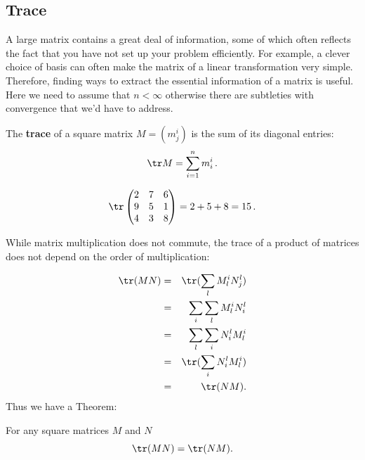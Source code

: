 \subsection{Trace}

A large matrix contains a great deal of information, some of which often reflects the fact that you have not set up your problem efficiently. For example, a clever choice of basis can often make the matrix of a linear transformation very simple. Therefore, finding ways to extract the essential information of a matrix is useful. Here we need to assume that $n < \infty$ otherwise there are subtleties with convergence that we'd have to address.

\begin{definition}
The \hypertarget{TRACE}{{\bf trace}} of a square matrix $M=(m_j^i)$ is the sum of its diagonal entries:
\[
\tr M = \sum_{i=1}^{n}m_i^i\, .
\]
\end{definition}

\begin{example}
\[
\tr \begin{pmatrix}
2 & 7 & 6\\
9 & 5 & 1\\
4 & 3 & 8\\
\end{pmatrix} = 2+5+8 = 15\, .
\]
\end{example}
While matrix multiplication does not commute, the trace of a product of matrices does not depend on the order of multiplication:

\begin{eqnarray*}
\tr(MN) & = & \tr( \sum_l M_l^i N_j^l ) \\
& = & \sum_i \sum_l M_l^i N_i^l \\
& = & \sum_l \sum_i N_i^l M_l^i \\
& = & \tr( \sum_i N_i^l M_l^i ) \\
& = & \tr( NM ).
\end{eqnarray*}
Thus we have a Theorem:
\begin{theorem} For any square matrices $M$ and $N$ $$\tr(MN)=\tr(NM).$$
\end{theorem}

